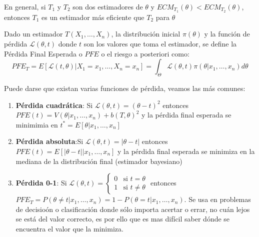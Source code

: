 \begin{observación}
En general, si $T_1$ y $T_2$ son dos estimadores de $\theta$ y $ECM_{T_1}(\theta) < ECM_{T_2}(\theta)$, entonces $T_1$ es un estimador más eficiente que $T_2$ para $\theta$
\end{observación}



\begin{definición}
Dado un estimador $T(X_1, \ldots, X_n)$, la distribución inicial $\pi(\theta)$ y la función de pérdida $\mathcal{L}(\theta, t)$ donde $t$ son los valores que toma el estimador, se define la Pérdida Final Esperada o $PFE$ o el riesgo a posteriori como:
$$PFE_T = E[\mathcal{L}(t, \theta) | X_1 = x_1, \ldots, X_n = x_n] = \int_{\Theta} \mathcal{L}(\theta, t)\pi(\theta | x_1, \ldots, x_n)d\theta$$
\end{definición}

\begin{proposición}
Puede darse que existan varias funciones de pérdida, veamos las más comunes:
\begin{enumerate}
  \item \textbf{Pérdida cuadrática}: Si $\mathcal{L}(\theta, t) = (\theta - t)^2$ entonces $PFE(t) = V(\theta | x_1,
          \ldots, x_n) + b(T, \theta)^2$ y la pérdida final esperada se minimimia en $t^*
          = E[\theta | x_1, \ldots, x_n]$
  \item \textbf{Pérdida absoluta}:Si $\mathcal{L}(\theta, t) = |\theta - t|$ entonces $PFE(t) = E[|\theta - t| |
              x_1, \ldots, x_n]$ y la pérdida final esperada se minimiza en la mediana de la
        distribución final (estimador bayesiano)
    \item \textbf{Pérdida 0-1}: Si $\mathcal{L}(\theta, t) = \begin{cases} 0 & \text{si } t = \theta \\ 1 & \text{si } t \neq \theta \end{cases}$ entonces $PFE_T = P(\theta \neq t | x_1, \ldots, x_n) = 1 - P(\theta = t | x_1, \ldots, x_n)$. Se usa en problemas de decisioón o clasificación donde sólo importa acertar o errar, no cuán lejos se está del valor correcto, es por ello que es mas difícil saber dónde se encuentra el valor que la minimiza.
\end{enumerate}
\end{proposición}


